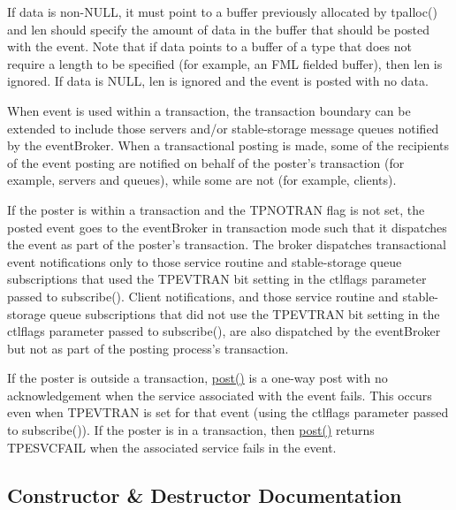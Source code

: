 If data is non-\/\+N\+U\+L\+L, it must point to a buffer previously allocated by tpalloc() and len should specify the amount of data in the buffer that should be posted with the event. Note that if data points to a buffer of a type that does not require a length to be specified (for example, an F\+M\+L fielded buffer), then len is ignored. If data is N\+U\+L\+L, len is ignored and the event is posted with no data.

When event is used within a transaction, the transaction boundary can be extended to include those servers and/or stable-\/storage message queues notified by the event\+Broker. When a transactional posting is made, some of the recipients of the event posting are notified on behalf of the poster’s transaction (for example, servers and queues), while some are not (for example, clients).

If the poster is within a transaction and the T\+P\+N\+O\+T\+R\+A\+N flag is not set, the posted event goes to the event\+Broker in transaction mode such that it dispatches the event as part of the poster’s transaction. The broker dispatches transactional event notifications only to those service routine and stable-\/storage queue subscriptions that used the T\+P\+E\+V\+T\+R\+A\+N bit setting in the ctlflags parameter passed to subscribe(). Client notifications, and those service routine and stable-\/storage queue subscriptions that did not use the T\+P\+E\+V\+T\+R\+A\+N bit setting in the ctlflags parameter passed to subscribe(), are also dispatched by the event\+Broker but not as part of the posting process’s transaction.

If the poster is outside a transaction, \hyperlink{classatmi_1_1event_a0b1f1faae17aa923ce5a4a0d45cfcd07}{post()} is a one-\/way post with no acknowledgement when the service associated with the event fails. This occurs even when T\+P\+E\+V\+T\+R\+A\+N is set for that event (using the ctlflags parameter passed to subscribe()). If the poster is in a transaction, then \hyperlink{classatmi_1_1event_a0b1f1faae17aa923ce5a4a0d45cfcd07}{post()} returns T\+P\+E\+S\+V\+C\+F\+A\+I\+L when the associated service fails in the event. 

\subsection{Constructor \& Destructor Documentation}
\hypertarget{classatmi_1_1event_a64e8905f6b027d052074cb801567b1b3}{}
